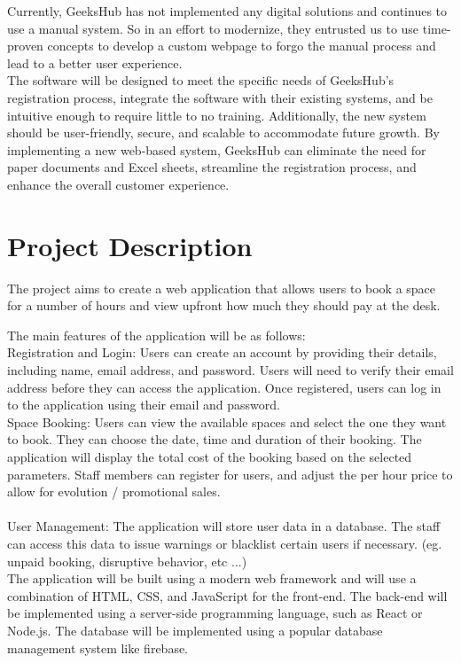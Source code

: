 \documentclass[hidelinks,a4paper,12pt]{article}
\begin{document}
Currently, GeeksHub has not implemented any digital solutions and continues to use a manual system. So in an effort to modernize, they entrusted us to use time-proven concepts to develop a custom webpage to forgo the manual process and lead to a better user experience.\\

The software will be designed to meet the specific needs of GeeksHub's registration process, integrate the software with their existing systems, and be intuitive enough to require little to no training. Additionally, the new system should be user-friendly, secure, and scalable to accommodate future growth. By implementing a new web-based system, GeeksHub can eliminate the need for paper documents and Excel sheets, streamline the registration process, and enhance the overall customer experience.
 \pagebreak 

\section{Project Description}
The project aims to create a web application that allows users to book a space for a number of hours and view upfront how much they should pay at the desk.
\parindent
\medskip

The main features of the application will be as follows:\\

Registration and Login: Users can create an account by providing their details, including name, email address, and password. Users will need to verify their email address before they can access the application. Once registered, users can log in to the application using their email and password.\\

Space Booking: Users can view the available spaces and select the one they want to book. They can choose the date, time and duration of their booking. The application will display the total cost of the booking based on the selected parameters. Staff members can register for users, and adjust the per hour price to allow for evolution / promotional sales.\\
\\
User Management: The application will store user data in a database. The staff can access this data to issue warnings or blacklist certain users if necessary. (eg. unpaid booking, disruptive behavior, etc ...)\\

The application will be built using a modern web framework and will use a combination of HTML, CSS, and JavaScript for the front-end. The back-end will be implemented using a server-side programming language, such as React or Node.js. The database will be implemented using a popular database management system like firebase.
\end{document}
